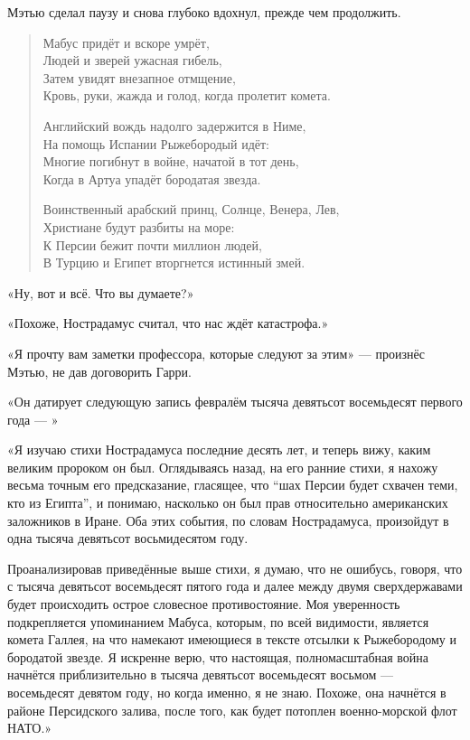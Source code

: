 \documentclass[a5paper, 9pt,
final, openany, twoside=true]{memoir}
\begin{document}
Мэтью сделал паузу и снова глубоко вдохнул, прежде чем продолжить.\bigskip
\begin{quote}
Мабус придёт и вскоре умрёт,\\
Людей и зверей ужасная гибель,\\
Затем увидят внезапное отмщение,\\
Кровь, руки, жажда и голод, когда пролетит комета.\bigskip

Английский вождь надолго задержится в Ниме,\\
На помощь Испании Рыжебородый идёт:\\
Многие погибнут в войне, начатой в тот день,\\
Когда в Артуа упадёт бородатая звезда.\bigskip

Воинственный арабский принц, Солнце, Венера, Лев,\\
Христиане будут разбиты на море:\\
К Персии бежит почти миллион людей,\\
В Турцию и Египет вторгнется истинный змей.
\end{quote}

«Ну, вот и всё. Что вы думаете?»

«Похоже, Нострадамус считал, что нас ждёт катастрофа.»

«Я прочту вам заметки профессора, которые следуют за этим» — произнёс Мэтью, не дав договорить Гарри.

«Он датирует следующую запись февралём тысяча девятьсот восемьдесят первого года — »\bigskip

«Я изучаю стихи Нострадамуса последние десять лет, и теперь вижу, каким великим пророком он был. Оглядываясь назад, на его ранние стихи, я нахожу весьма точным его предсказание, гласящее, что ``шах Персии будет схвачен теми, кто из Египта'', и понимаю, насколько он был прав относительно американских заложников в Иране. Оба этих события, по словам Нострадамуса, произойдут в одна тысяча девятьсот восьмидесятом году.

Проанализировав приведённые выше стихи, я думаю, что не ошибусь, говоря, что с тысяча девятьсот восемьдесят пятого года и далее между двумя сверхдержавами будет происходить острое словесное противостояние. Моя уверенность подкрепляется упоминанием Мабуса, которым, по всей видимости, является комета Галлея, на что намекают имеющиеся в тексте отсылки к Рыжебородому и бородатой звезде. Я искренне верю, что настоящая, полномасштабная война начнётся приблизительно в тысяча девятьсот восемьдесят восьмом — восемьдесят девятом году, но когда именно, я не знаю. Похоже, она начнётся в районе Персидского залива, после того, как будет потоплен военно-морской флот НАТО.»\bigskip
\end{document}
